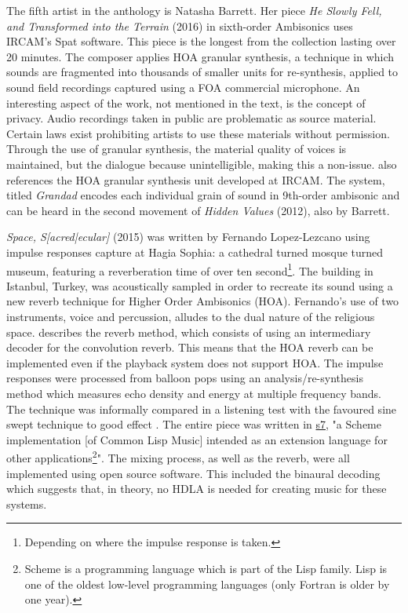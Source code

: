 The fifth artist in the anthology \cite{hagan2017sound} is Natasha Barrett. Her piece \textit{He Slowly Fell, and Transformed into the Terrain} (2016) in sixth-order Ambisonics uses IRCAM's Spat software. This piece is the longest from the collection lasting over 20 minutes. The composer applies HOA granular synthesis, a technique in which sounds are fragmented into thousands of smaller units for re-synthesis, applied to sound field recordings captured using a FOA commercial microphone. An interesting aspect of the work, not mentioned in the text, is the concept of privacy. Audio recordings taken in public are problematic as source material. Certain laws exist prohibiting artists to use these materials without permission. Through the use of granular synthesis, the material quality of voices is maintained, but the dialogue because unintelligible, making this a non-issue. \cite{barrett2016musical} also references the HOA granular synthesis unit developed at IRCAM. The system, titled \textit{Grandad} encodes each individual grain of sound in 9th-order ambisonic and can be heard in the second movement of \textit{Hidden Values} (2012), also by Barrett. 


\textit{Space, S[acred|ecular]} (2015) was written by Fernando Lopez-Lezcano using impulse responses capture at Hagia Sophia: a cathedral turned mosque turned museum, featuring a reverberation time of over ten second\footnote{Depending on where the impulse response is taken.}. The building in Istanbul, Turkey, was acoustically sampled in order to recreate its sound using a new reverb technique for Higher Order Ambisonics (HOA). Fernando's use of two instruments, voice and percussion, alludes to the dual nature of the religious space.  \cite{lopez2014architecture} describes the reverb method, which consists of using an intermediary decoder for the convolution reverb. This means that the HOA reverb can be implemented even if the playback system does not support HOA. The impulse responses were processed from balloon pops using an analysis/re-synthesis method which measures echo density and energy at multiple frequency bands. The technique was informally compared in a listening test with the favoured sine swept technique to good effect \cite{abel2010estimating}. The entire piece was written in \href{https://ccrma.stanford.edu/software/snd/snd/s7.html#juce}{s7}, "a Scheme implementation [of Common Lisp Music] intended as an extension language for other applications\footnote{Scheme is a programming language which is part of the Lisp family. Lisp is one of the oldest low-level programming languages (only Fortran is older by one year).}". The mixing process, as well as the reverb, were all implemented using open source software. This included the binaural decoding which suggests that, in theory, no HDLA is needed for creating music for these systems. 

